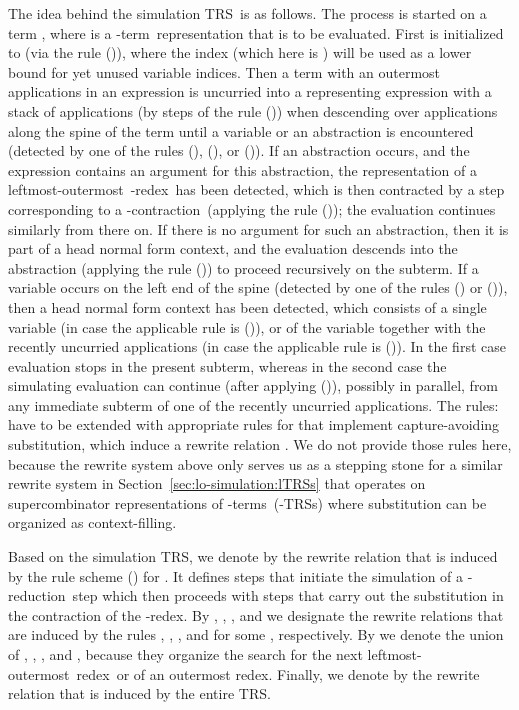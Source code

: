 \documentclass[
submission
]{dmtcs-episciences-tampered}
\newcommand{\nb}{\nobreakdash}
\newcommand{\TRS}{TRS}
\newcommand{\lambdaterm}{\nb-term}
\newcommand{\lambdaterms}{\lambdaterm{s}}
\newcommand{\betareduction}{\nb-re\-duc\-tion}
\newcommand{\betacontraction}{\nb-con\-trac\-tion}
\newcommand{\betaredex}{\nb-re\-dex}
\newcommand{\lo}{left\-most-outer\-most}
\newcommand{\loredex}{\lo\ re\-dex}
\newcommand{\lTRS}{\hspace*{-0.5pt}\nb-\hspace*{-0.5pt}\TRS}
\newcommand{\lTRSs}{\lTRS{s}}
\theoremstyle{plain}
\theoremstyle{definition}
\begin{document}
The idea behind the simulation \TRS\ is as follows.
The process is started on a term , where  is a \lambdaterm\ representation that is to be evaluated.
First  is initialized to  (via the rule ()), 
where the index (which here is ) will be used as a lower bound for yet unused variable indices. 
Then a term  with an outermost applications in an expression 
is uncurried into a representing expression with a stack of applications
(by steps of the rule ())
when descending over applications along the spine of the term 
until a variable or an abstraction is encountered 
(detected by one of the rules (), (), or ()).
If an abstraction occurs, and the expression contains an argument for this abstraction,
the representation of a \lo\ \betaredex\ has been detected, 
which is then contracted by a step corresponding to a \betacontraction\
(applying the rule ()); the evaluation continues similarly from there on.
If there is no argument for such an abstraction, 
then it is part of a head normal form context,
and the evaluation descends into the abstraction (applying the rule ()) 
to proceed recursively on the subterm.
If a variable occurs on the left end of the spine (detected by one of the rules () or ()), 
then a head normal form context has been detected,
which consists of a single variable (in case the applicable rule is ()),
or of the variable together with the recently uncurried applications (in case the applicable rule is ()).
In the first case evaluation stops in the present subterm,
whereas in the second case the simulating evaluation can continue (after applying ()), 
possibly in parallel, from any immediate subterm of one of the recently uncurried applications.
The rules:\label{def:losim:TRS:ltermreps}
have to be extended with appropriate rules for  that implement capture-avoiding substitution,
which induce a rewrite relation . 
We do not provide those rules here, because the rewrite system above only serves us as a stepping stone
for a similar rewrite system in Section~\ref{sec:lo-simulation:lTRSs}
that operates on supercombinator representations of \lambdaterms\ (\lTRSs)
where substitution can be organized as context-filling.



Based on the simulation \TRS, we denote by  the rewrite relation that is induced by the rule scheme () for .
It defines steps that initiate the simulation of a \betareduction\ step which then proceeds with  steps 
  that carry out the substitution in the contraction of the \betaredex.
By , , , and 
we designate the rewrite relations that are induced by the rules
, , , and  for some , respectively.
By  we denote the union of , , , and ,
because they organize the search 
for the next \loredex\ or of an outermost redex. Finally, we denote by  the rewrite relation that is induced by the entire TRS.
\end{document}
